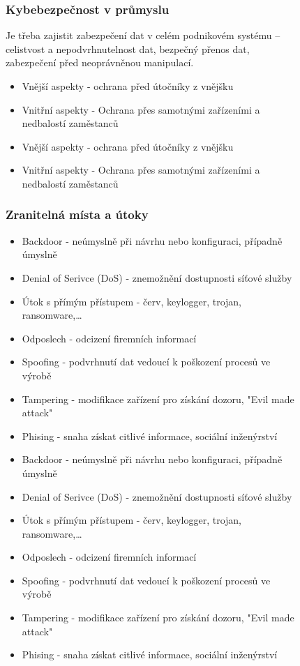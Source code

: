 \begin{figure}[h]
\subsubsection*{Kybebezpečnost v průmyslu}
Je třeba zajistit zabezpečení dat v celém podnikovém systému – celistvost a nepodvrhnutelnost dat, bezpečný přenos dat, zabezpečení před neoprávněnou manipulací.
\begin{itemize}
  \item Vnější aspekty - ochrana před útočníky z vnějšku
  \item Vnitřní aspekty - Ochrana přes samotnými zařízeními a nedbalostí zaměstanců
    \item Vnější aspekty - ochrana před útočníky z vnějšku
    \item Vnitřní aspekty - Ochrana přes samotnými zařízeními a nedbalostí zaměstanců
\end{itemize}

\subsubsection*{Zranitelná místa a útoky}
\begin{itemize}
  \item Backdoor - neúmyslně při návrhu nebo konfiguraci, případně úmyslně
  \item Denial of Serivce (DoS) - znemožnění dostupnosti síťové služby
  \item Útok s přímým přístupem - červ, keylogger, trojan, ransomware,\dots
  \item Odposlech - odcizení firemních informací
  \item Spoofing - podvrhnutí dat vedoucí k poškození procesů ve výrobě
  \item Tampering - modifikace zařízení pro získání dozoru, "Evil made attack"
  \item Phising - snaha získat citlivé informace, sociální inženýrství
    \item Backdoor - neúmyslně při návrhu nebo konfiguraci, případně úmyslně
    \item Denial of Serivce (DoS) - znemožnění dostupnosti síťové služby
    \item Útok s přímým přístupem - červ, keylogger, trojan, ransomware,\dots
    \item Odposlech - odcizení firemních informací
    \item Spoofing - podvrhnutí dat vedoucí k poškození procesů ve výrobě
    \item Tampering - modifikace zařízení pro získání dozoru, "Evil made attack"
    \item Phising - snaha získat citlivé informace, sociální inženýrství
\end{itemize}


\end{figure}
